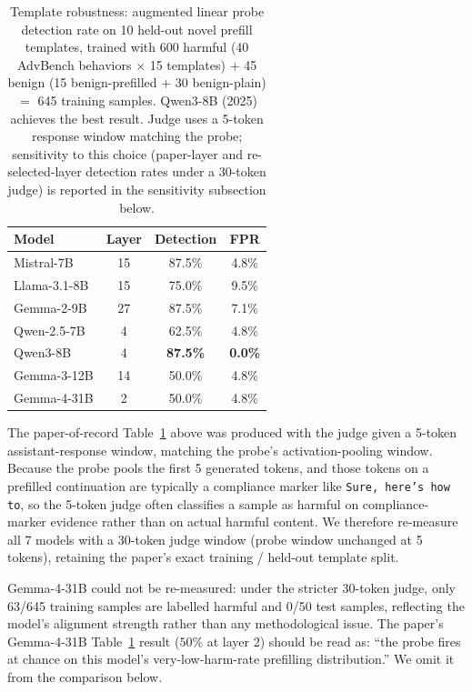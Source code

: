 \documentclass{article}
\begin{document}
\begin{table}[H]
\caption{Template robustness: augmented linear probe detection rate on 10 held-out novel prefill templates, trained with 600 harmful (40 AdvBench behaviors $\times$ 15 templates) $+$ 45 benign (15 benign-prefilled $+$ 30 benign-plain) $=$ 645 training samples. Qwen3-8B (2025) achieves the best result. Judge uses a 5-token response window matching the probe; sensitivity to this choice (paper-layer and re-selected-layer detection rates under a 30-token judge) is reported in the sensitivity subsection below.}
\label{tab:template}
\centering
\small
\begin{tabular}{lccc}
\toprule
\textbf{Model} & \textbf{Layer} & \textbf{Detection} & \textbf{FPR} \\
\midrule
Mistral-7B    & 15 & 87.5\% & 4.8\% \\
Llama-3.1-8B  & 15 & 75.0\% & 9.5\% \\
Gemma-2-9B    & 27 & 87.5\% & 7.1\% \\
Qwen-2.5-7B   & 4  & 62.5\% & 4.8\% \\
Qwen3-8B      & 4  & \textbf{87.5\%} & \textbf{0.0\%} \\
Gemma-3-12B   & 14 & 50.0\% & 4.8\% \\
Gemma-4-31B   & 2  & 50.0\% & 4.8\% \\
\bottomrule
\end{tabular}
\end{table}

The paper-of-record Table~\ref{tab:template} above was produced with the judge given a 5-token assistant-response window, matching the probe's activation-pooling window. Because the probe pools the first 5 generated tokens, and those tokens on a prefilled continuation are typically a compliance marker like \texttt{Sure, here's how to}, so the 5-token judge often classifies a sample as harmful on compliance-marker evidence rather than on actual harmful content. We therefore re-measure all 7 models with a 30-token judge window (probe window unchanged at 5 tokens), retaining the paper's exact training / held-out template split.

Gemma-4-31B could not be re-measured: under the stricter 30-token judge, only 63/645 training samples are labelled harmful and 0/50 test samples, reflecting the model's alignment strength rather than any methodological issue. The paper's Gemma-4-31B Table~\ref{tab:template} result ($50\%$ at layer 2) should be read as: ``the probe fires at chance on this model's very-low-harm-rate prefilling distribution.'' We omit it from the comparison below.
\end{document}
